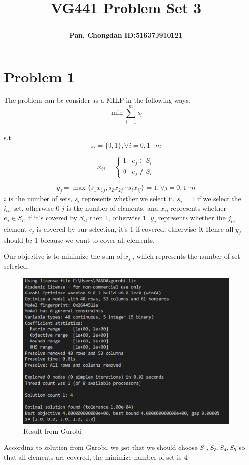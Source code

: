 \documentclass[a4paper]{article}
\title{\Large \textbf{VG441 Problem Set 3}\\
\author{\textbf{Pan, Chongdan ID:516370910121}\\
}
}
\begin{document}
\maketitle
\section{Problem 1}
\quad 
The problem can be consider as a MILP in the following ways:
$$\min \sum_{i=1}^{m}s_i$$
\\s.t.
$$s_i=\{0, 1\},\forall i=0,1\cdots m$$
\begin{center}
    \[x_{ij}=\begin{cases}
        1 & e_j\in S_i\\
        0 & e_j\notin S_i
    \end{cases}\]
\end{center}
$$y_j=\max\{s_1x_{1j},s_2x_{2j}\cdots s_ix_{ij} \}=1,\forall j=0,1\cdots n$$
$i$ is the number of sets, $s_i$ represents whether we select it, $s_i=1$ if we select the $i_{th}$ set, otherwise 0
$j$ is the number of elements, and $x_{ij}$ represents whether $e_j\in S_i$, if it's covered by $S_i$, then 1, otherwise 1. $y_j$ represents whether the $j_{th}$ element $e_j$ is covered by our selection, it's 1 if covered, otherwise 0. Hence all $y_j$ should be 1 because we want to cover all elements.
\par Our objective is to minimize the sum of $x_{s_i}$, which represents the number of set selected.
\begin{figure}[H]
    \centering
    \includegraphics[scale=0.5]{P1.png}
    \caption{Result from Gurobi}
\end{figure}
\par According to solution from Gurobi, we get that we should choose $S_1,S_3,S_4,S_5$ so that all elements are covered, the minimize number of set is 4.
\end{document}
